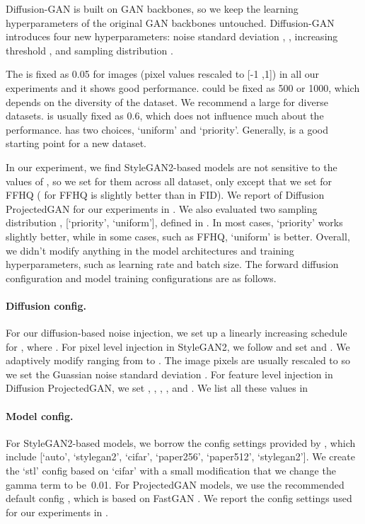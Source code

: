 \documentclass{article} \usepackage{iclr2023_conference,times}
\theoremstyle{plain}
\theoremstyle{definition}
\theoremstyle{remark}
\begin{document}
{Diffusion-GAN is built on GAN backbones, so we keep the learning hyperparameters of the original GAN backbones untouched. Diffusion-GAN introduces four new hyperparameters: noise standard deviation , ,  increasing threshold , and  sampling distribution .

The  is fixed as 0.05 for images (pixel values rescaled to [-1 ,1]) in all our experiments and it shows good performance.  could be fixed as 500 or 1000, which depends on the diversity of the dataset. We recommend a large  for diverse datasets.  is usually fixed as 0.6, which does not influence much about the performance.  has two choices, `uniform' and `priority'. Generally,  is a good starting point for a new dataset. 
}

{In our experiment,} we find StyleGAN2-based models are not sensitive to the values of , so we set  for them across all dataset, only except that we set  for FFHQ ( for FFHQ is slightly better than  in FID). We report  of Diffusion ProjectedGAN for our experiments in . We also evaluated two  sampling distribution , [`priority', `uniform'], defined in . In most cases, `priority' works slightly better, while in some cases, such as FFHQ, `uniform' is better. Overall, we didn't modify anything in the model architectures and training hyperparameters, such as learning rate and batch size. The forward diffusion configuration and model training configurations are as follows. 


\paragraph{Diffusion config.} For our diffusion-based noise injection, we set up a linearly increasing schedule for , where . For pixel level injection in StyleGAN2, we follow \citet{ddpm} and set  and . We adaptively modify  ranging from  to . The image pixels are usually rescaled to  so we set the Guassian noise standard deviation . For feature level injection in Diffusion ProjectedGAN, we set , , , , and . We list all these values in 

\paragraph{Model config.} For StyleGAN2-based models, we borrow the config settings provided by \citet{karras2020training}, which include [`auto', `stylegan2', `cifar', `paper256', `paper512', `stylegan2']. We create the `stl' config based on `cifar' with a small modification that we change the gamma term to be~0.01. For ProjectedGAN models, we use the recommended default config \citep{sauer2021projected}, which is based on FastGAN \citep{liu2020towards}. We report the config settings  used for our experiments in . 
\end{document}
